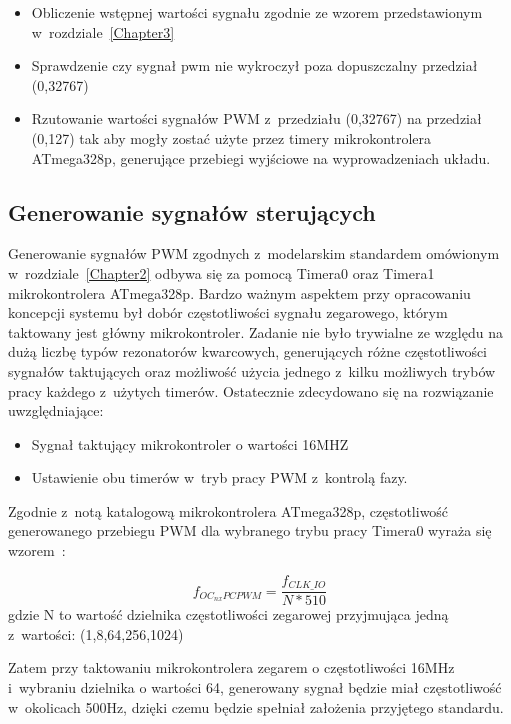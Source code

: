 \begin{itemize}
	\item Obliczenie wstępnej wartości sygnału zgodnie ze wzorem przedstawionym w~rozdziale~\ref{Chapter3}
	\item Sprawdzenie czy sygnał pwm nie wykroczył poza dopuszczalny przedział (0,32767)
	\item Rzutowanie wartości sygnałów PWM z~przedziału (0,32767) na przedział (0,127) tak aby mogły zostać użyte przez timery mikrokontrolera ATmega328p, generujące przebiegi wyjściowe na wyprowadzeniach układu. 
\end{itemize}


\subsection{Generowanie sygnałów sterujących}

Generowanie sygnałów PWM zgodnych z~modelarskim standardem omówionym w~rozdziale~\ref{Chapter2} odbywa się za pomocą Timera0 oraz Timera1 mikrokontrolera ATmega328p. Bardzo ważnym aspektem przy opracowaniu koncepcji systemu był dobór częstotliwości sygnału zegarowego, którym taktowany jest główny mikrokontroler. Zadanie nie było trywialne ze względu na dużą liczbę typów rezonatorów kwarcowych, generujących różne częstotliwości sygnałów taktujących oraz możliwość użycia jednego z~kilku możliwych trybów pracy każdego z~użytych timerów. Ostatecznie zdecydowano się na rozwiązanie uwzględniające:
\begin{itemize}
	\item Sygnał taktujący mikrokontroler o wartości 16MHZ
	\item Ustawienie obu timerów w~tryb pracy PWM z~kontrolą fazy.
\end{itemize}

Zgodnie z~notą katalogową mikrokontrolera ATmega328p, częstotliwość generowanego przebiegu PWM dla wybranego trybu pracy Timera0 wyraża się wzorem~\cite{ds_atmega328p}:

\begin{equation}
	f_{OC_{nx}PCPWM} = \frac{f_{CLK\_IO}}{N * 510}
\end{equation}
gdzie N to wartość dzielnika częstotliwości zegarowej przyjmująca jedną z~wartości: (1,8,64,256,1024)
 
Zatem przy taktowaniu mikrokontrolera zegarem o częstotliwości 16MHz i~wybraniu dzielnika o wartości 64, generowany sygnał będzie miał częstotliwość w~okolicach 500Hz, dzięki czemu będzie spełniał założenia przyjętego standardu. 

